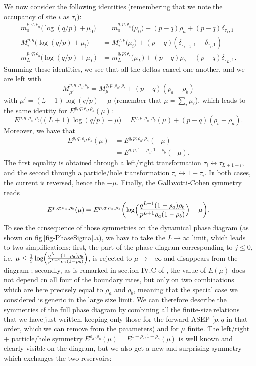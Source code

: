 \documentclass[aps,pre,onecolumn,showpacs,showkeys,a4paper]{revtex4-1}
\begin{document}
We now consider the following identities (remembering that we note the occupancy of site $i$ as $\tau_i$):
\begin{align}
m_0^{p,q;\rho_a}\bigl(\log(q/p)+\mu_0\bigr)&=m_0^{q,p;\rho_a}\bigl(\mu_0\bigr)-(p-q)\rho_a+(p-q)\delta_{\tau_1,1}\\
M_{i}^{p,q}\bigl(\log(q/p)+\mu_i\bigr)&=M_{i}^{q,p}\bigl(\mu_i\bigr)+(p-q)(\delta_{\tau_{i+1},1}-\delta_{\tau_i,1})\\
m_L^{p,q;\rho_b}\bigl(\log(q/p)+\mu_L\bigr)&=m_L^{q,p;\rho_b}\bigl(\mu_L\bigr)+(p-q)\rho_b-(p-q)\delta_{\tau_L,1}.
\end{align}
Summing those identities, we see that all the deltas cancel one-another, and we are left with
\begin{equation}
M_{\mu'}^{p,q;\rho_a,\rho_b}=M_{\mu}^{q,p;\rho_a,\rho_b}+(p-q)(\rho_a-\rho_b)
\end{equation}
with $\mu'=(L+1)\log(q/p)+\mu$ (remember that $\mu=\sum_i \mu_i$), which leads to the same identity for $E^{p,q;\rho_a,\rho_b}(\mu)$:
\begin{equation}
E^{p,q;\rho_a,\rho_b}\bigl((L+1)\log(q/p)+\mu\bigr)=E^{q,p;\rho_a,\rho_b}(\mu)+(p-q)(\rho_b-\rho_a).
\end{equation}
Moreover, we have that
\begin{align}
E^{p,q;\rho_a,\rho_b}(\mu)&=E^{q,p;\rho_b,\rho_a}(-\mu)\\
&=E^{q,p;1-\rho_a,1-\rho_b}(-\mu).
\end{align}
The first equality is obtained through a left/right transformation $\tau_i\leftrightarrow\tau_{L+1-i}$, and the second through a particle/hole transformation $\tau_i\leftrightarrow 1-\tau_i$. In both cases, the current is reversed, hence the $-\mu$. Finally, the Gallavotti-Cohen symmetry reads
\begin{equation}
E^{p,q;\rho_a,\rho_b}(\mu)=E^{p,q;\rho_a,\rho_b}\biggl(\log\Bigl(\frac{q^{L+1}(1-\rho_a)\rho_b}{p^{L+1}\rho_a(1-\rho_b)}\Bigr)-\mu\biggr).
\end{equation}
To see the consequence of those symmetries on the dynamical phase diagram (as shown on fig.\ref{fig-PhaseSigma}.a), we have to take the $L\rightarrow\infty$ limit, which leads to two simplifications: first, the part of the phase diagram corresponding to $j\leq 0$, i.e. $\mu\leq \frac{1}{2}\log\Bigl(\frac{q^{L+1}(1-\rho_a)\rho_b}{p^{L+1}\rho_a(1-\rho_b)}\Bigr)$, is rejected to $\mu\rightarrow-\infty$ and disappears from the diagram ; secondly, as is remarked in section IV.C of \cite{Lazarescu2015}, the value of $E(\mu)$ does not depend on all four of the boundary rates, but only on two combinations which are here precisely equal to $\rho_a$ and $\rho_b$, meaning that the special case we considered is generic in the large size limit. We can therefore describe the symmetries of the full phase diagram by combining all the finite-size relations that we have just written, keeping only those for the forward ASEP ($p,q$ in that order, which we can remove from the parameters) and for $\mu$ finite. The left/right $+$ particle/hole symmetry $E^{\rho_a,\rho_b}(\mu)=E^{1-\rho_b,1-\rho_a}(\mu)$ is well known and clearly visible on the diagram, but we also get a new and surprising symmetry which exchanges the two reservoirs:
\end{document}
